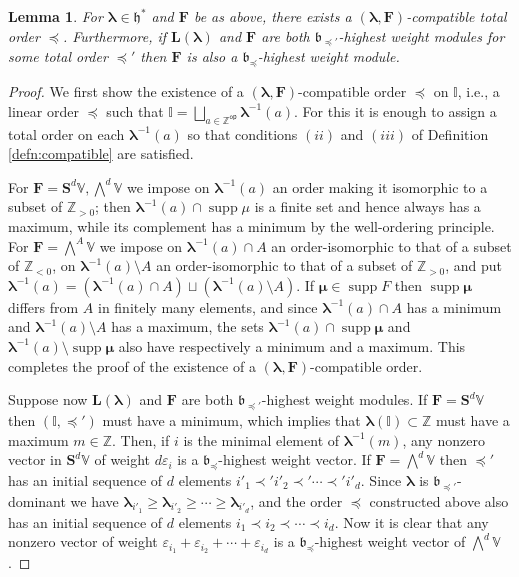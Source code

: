 \documentclass[11pt,fleqn]{amsart}
\newcommand\ZZ{\mathbb Z}
\newcommand\II{\mathbb I}
\renewcommand\epsilon{\varepsilon}
\newtheorem{lem}[thm]{Lemma}
\theoremstyle{definition}
\theoremstyle{remark}
\theoremstyle{remark}
\newcommand\VV{\mathbb V}
\renewcommand\SS{\mathbf S}
\newcommand\lie[1]{\mathfrak{#1}}
\newcommand\op{\mathsf{op}}
\newcommand\wt[1]{\boldsymbol{#1}}
\DeclareMathOperator\supp{supp}
\begin{document}
\begin{lem}
For $\wt\lambda \in \lie h^*$ and $\mathbf F$ be as above, there exists a 
$(\wt\lambda,\mathbf F)$-compatible total order $\preceq$. Furthermore, if 
$\mathbf L(\wt\lambda)$ and $\mathbf F$ are both $\lie b_{\preceq'}$-highest 
weight modules for some total order $\preceq'$ then $\mathbf F$ is also a 
$\lie b_{\preceq}$-highest weight module.
\end{lem}
\begin{proof}
We first show the existence of a $(\wt\lambda,\mathbf F)$-compatible order 
$\preceq$
on $\II$, i.e., a linear order $\preceq$ such that $\II = \bigsqcup_{a \in 
\ZZ^\op} \wt\lambda^{-1}(a)$. For this it is enough to assign a total order on 
each $\wt\lambda^{-1}(a)$ so that conditions $(ii)$ and $(iii)$ of Definition
\ref{defn:compatible} are satisfied.

For $\mathbf F = \SS^d\VV, \bigwedge^d \VV$ we impose on $\wt\lambda^{-1}(a)$ 
an order making it isomorphic to a subset of $\ZZ_{>0}$; then 
$\wt\lambda^{-1}(a) \cap \supp \mu$ is a finite set and hence always has a 
maximum, while its complement has a minimum by the well-ordering principle. 
For $\mathbf F = \bigwedge^A \VV$ we impose on $\wt\lambda^{-1}(a) 
\cap A$ an order-isomorphic to that of a subset of $\ZZ_{<0}$, on 
$\wt\lambda^{-1}(a) \setminus A$ an order-isomorphic to that of a subset of  
$\ZZ_{>0}$, and put $\wt\lambda^{-1}(a) = (\wt\lambda^{-1}(a) \cap A) \sqcup 
(\wt\lambda^{-1}(a) \setminus A)$. 
If $\wt\mu \in \supp F$ then $\supp \wt\mu$ differs from $A$ in finitely many 
elements, and since $\wt\lambda^{-1}(a) \cap A$ has a minimum and 
$\wt\lambda^{-1}(a) \setminus A$ has a maximum, the sets $\wt\lambda^{-1}(a) 
\cap \supp \wt\mu$ and $\wt\lambda^{-1}(a) \setminus \supp \wt\mu$ also have 
respectively a minimum and a maximum. This completes the proof of the existence 
of a $(\wt\lambda, \mathbf F)$-compatible order.

Suppose now $\mathbf L(\wt\lambda)$ and $\mathbf F$ are both $\lie 
b_{\preceq'}$-highest weight modules. If $\mathbf F = \SS^d\VV$ then $(\II,
\preceq')$ must have a minimum, which implies that $\wt\lambda(\II) \subset 
\ZZ$ must have a maximum $m \in \ZZ$. Then, if $i$ is the minimal element of 
$\wt\lambda^{-1}(m)$, any nonzero vector in $\SS^d\VV$ of weight $d \epsilon_i$ 
is a 
$\lie b_{\preceq}$-highest weight vector. If $\mathbf F = \bigwedge^d \VV$ then 
$\preceq'$ has an initial sequence of $d$ elements $i'_1 \prec' i'_2 \prec' 
\cdots \prec' i'_d$. Since $\wt\lambda$ is $\lie b_{\preceq'}$-dominant we  
have $\wt\lambda_{i'_1} \geq \wt\lambda_{i'_2} \geq \cdots \geq 
\wt\lambda_{i'_d}$, and the order $\preceq$ constructed above also has an 
initial sequence of $d$ elements $i_1 \prec i_2 \prec \cdots \prec i_d$. Now it 
is clear that any nonzero vector of weight $\epsilon_{i_1} + \epsilon_{i_2} + 
\cdots + \epsilon_{i_d}$ is a $\lie b_{\preceq}$-highest weight vector of 
$\bigwedge^d \VV$. 


\end{proof}
\end{document}
